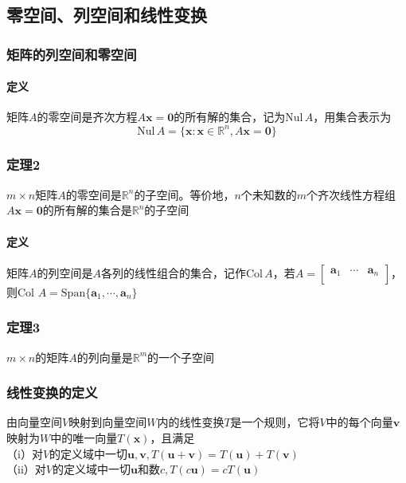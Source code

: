 \documentclass{article}
\newcommand{\ve}{\boldsymbol}
\newcommand{\spans}{\text{Span}}
\begin{document}
\begin{CJK}{UTF8}{gkai}
\subsection{零空间、列空间和线性变换}
\subsubsection{矩阵的列空间和零空间}
\paragraph{定义\\}
矩阵$A$的零空间是齐次方程$A\ve{x}=\ve{0}$的所有解的集合，记为$\text{Nul}\, A$，用集合表示为
\[\text{Nul}\, A = \{\ve{x}:\ve{x}\in \mathbb{R}^n , A\ve{x} = \ve{0}\}\]

\subsubsection{定理2}
$m\times n$矩阵$A$的零空间是$\mathbb{R}^n$的子空间。等价地，$n$个未知数的$m$个齐次线性方程组$A\ve{x}=\ve{0}$的所有解的集合是$\mathbb{R}^n$的子空间\\

\paragraph{定义\\}

矩阵$A$的列空间是$A$各列的线性组合的集合，记作$\text{Col}\, A$，若$A = \begin{bmatrix}\ve{a}_1&\cdots&\ve{a}_n\\\end{bmatrix}$，则Col $A = \spans\{\ve{a}_1,\cdots,\ve{a}_n\}$

\subsubsection{定理3}
$m\times n$的矩阵$A$的列向量是$\mathbb{R}^m$的一个子空间\\
\subsubsection{线性变换的定义}

由向量空间$V$映射到向量空间$W$内的线性变换$T$是一个规则，它将$V$中的每个向量$\ve{v}$映射为$W$中的唯一向量$T(\ve{x})$，且满足\\
（i）对$V$的定义域中一切$\ve{u},\ve{v},T(\ve{u}+\ve{v})=T(\ve{u})+T(\ve{v})$\\
（ii）对$V$的定义域中一切$\ve{u}$和数$c,T(c\ve{u})=cT(\ve{u})$\\


\end{CJK}
\end{document}
